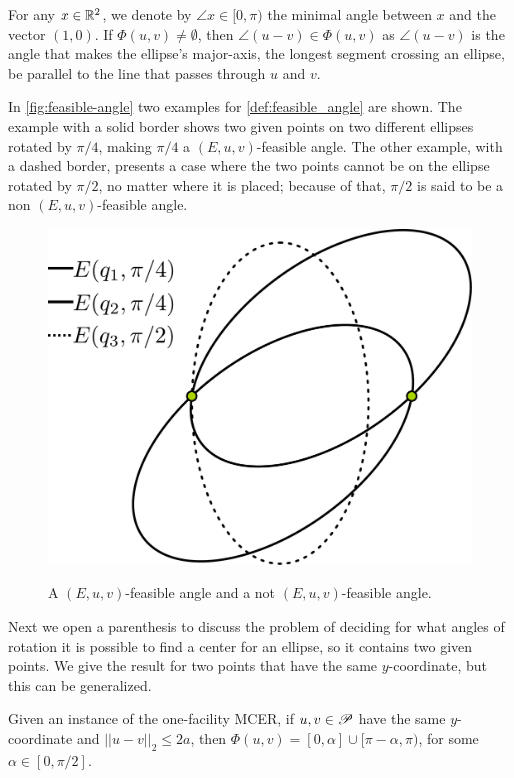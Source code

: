 For any $x\in\mathbb{R}^2$, we denote by $\angle x\in [0, \pi)$ the minimal angle between $x$ and the vector $(1, 0)$. If $\Phi(u,v)\neq\emptyset$, then $\angle(u-v)\in  \Phi(u,v)$ as $\angle(u-v)$ is the angle that makes the ellipse's major-axis, the longest segment crossing an ellipse, be parallel to the line that passes through $u$ and $v$.

In \autoref{fig:feasible-angle} two examples for \autoref{def:feasible_angle} are shown. The example with a solid border shows two given points on two different ellipses rotated by $\pi/4$, making $\pi/4$ a $(E, u, v)$-feasible angle.
The other example, with a dashed border, presents a case where the two points cannot be on the ellipse rotated by $\pi/2$, no matter where it is placed; because of that, $\pi/2$ is said to be a non $(E, u, v)$-feasible angle.

\begin{figure}[H]
	\centering
	\caption{A $(E, u, v)$-feasible angle and a not $(E, u, v)$-feasible angle.}
	\includegraphics[scale=.28]{tex/figures/feasible-angle2}
	\fautor
	\label{fig:feasible-angle}
\end{figure}

Next we open a parenthesis to discuss the problem of deciding for what angles of rotation it is possible to find a center for an ellipse, so it contains two given points. We give the result for two points that have the same $y$-coordinate, but this can be generalized.

\begin{lema}\label{lema:l-function}
	Given an instance of the one-facility MCER, if $u, v \in \mathscr{P}$ have the same $y$-coordinate and $||u-v||_2 \le 2a$, then $\Phi(u,v) = [0, \alpha] \cup [\pi - \alpha, \pi)$, for some $\alpha \in [0, \pi/2]$.
\end{lema}

